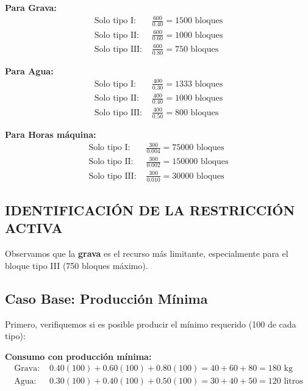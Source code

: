 \documentclass[12pt, a4paper, oneside]{book}
\theoremstyle{definition}
\begin{document}
    \textbf{Para Grava:}
    \begin{align}
    \text{Solo tipo I: } &\frac{600}{0.40} = 1500 \text{ bloques} \\
    \text{Solo tipo II: } &\frac{600}{0.60} = 1000 \text{ bloques} \\
    \text{Solo tipo III: } &\frac{600}{0.80} = 750 \text{ bloques}
    \end{align}

    \textbf{Para Agua:}
    \begin{align}
    \text{Solo tipo I: } &\frac{400}{0.30} = 1333 \text{ bloques} \\
    \text{Solo tipo II: } &\frac{400}{0.40} = 1000 \text{ bloques} \\
    \text{Solo tipo III: } &\frac{400}{0.50} = 800 \text{ bloques}
    \end{align}

    \textbf{Para Horas máquina:}
    \begin{align}
    \text{Solo tipo I: } &\frac{300}{0.004} = 75000 \text{ bloques} \\
    \text{Solo tipo II: } &\frac{300}{0.002} = 150000 \text{ bloques} \\
    \text{Solo tipo III: } &\frac{300}{0.010} = 30000 \text{ bloques}
    \end{align}

    \subsection{IDENTIFICACIÓN DE LA RESTRICCIÓN ACTIVA}

    Observamos que la \textbf{grava} es el recurso más limitante, especialmente para el bloque tipo III (750 bloques máximo).


    \subsection{Caso Base: Producción Mínima}

    Primero, verifiquemos si es posible producir el mínimo requerido (100 de cada tipo):

    \textbf{Consumo con producción mínima:}
    \begin{align}
    \text{Grava: } &0.40(100) + 0.60(100) + 0.80(100) = 40 + 60 + 80 = 180 \text{ kg} \\
    \text{Agua: } &0.30(100) + 0.40(100) + 0.50(100) = 30 + 40 + 50 = 120 \text{ litros}
    \end{align}
\end{document}
